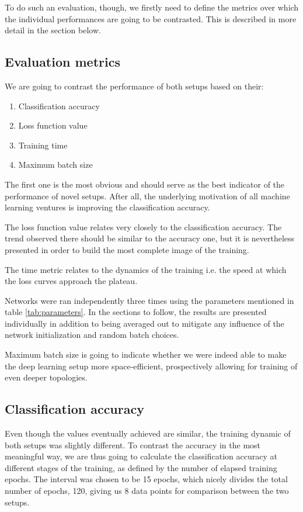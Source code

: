 \documentclass[a4paper, 12pt]{article}
\numberwithin{equation}{section}
\begin{document}
	To do such an evaluation, though, we firstly need to define the metrics over which the individual performances are going to be contrasted. This is described in more detail in the section below.
	
	\subsection{Evaluation metrics}
	
	We are going to contrast the performance of both setups based on their:
	\begin{enumerate}
		\item Classification accuracy
		\item Loss function value
		\item Training time
		\item Maximum batch size
	\end{enumerate}

	The first one is the most obvious and should serve as the best indicator of the performance of novel setups. After all, the underlying motivation of all machine learning ventures is improving the classification accuracy.
	
	The loss function value relates very closely to the classification accuracy. The trend observed there should be similar to the accuracy one, but it is nevertheless presented in order to build the most complete image of the training.
	
	The time metric relates to the dynamics of the training i.e. the speed at which the loss curves approach the plateau.
	
	Networks were ran independently three times using the parameters mentioned in table \ref{tab:parameters}. In the sections to follow, the results are presented individually in addition to being averaged out to mitigate any influence of the network initialization and random batch choices.
	
	Maximum batch size is going to indicate whether we were indeed able to make the deep learning setup more space-efficient, prospectively allowing for training of even deeper topologies.
	
	\subsection{Classification accuracy}
	
	Even though the values eventually achieved are similar, the training dynamic of both setups was slightly different. To contrast the accuracy in the most meaningful way, we are thus going to calculate the classification accuracy at different stages of the training, as defined by the number of elapsed training epochs. The interval was chosen to be 15 epochs, which nicely divides the total number of epochs, 120, giving us 8 data points for comparison between the two setups.
	
\end{document}
